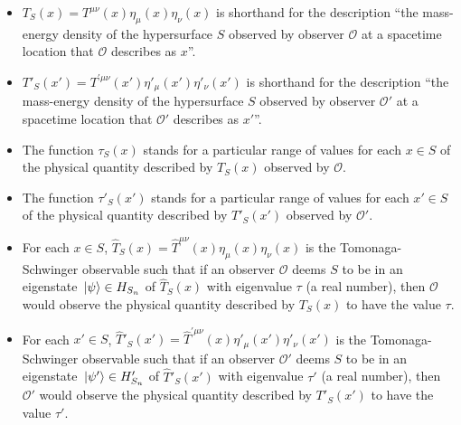 \begin{itemize}
%
\item $T_S(x)={T}^{\mu\nu}(x)\eta_{\mu}(x)\eta_{\nu}(x)$ is shorthand for the description ``the mass-energy density of the hypersurface $S$ observed by observer $\mathcal{O}$ at a spacetime location that $\mathcal{O}$ describes as $x$''. 
\item $T'_S(x')={T}^{\prime\mu\nu}(x')\eta'_{\mu}(x')\eta'_{\nu}(x')$ is shorthand for the description ``the mass-energy density of the hypersurface $S$ observed by observer $\mathcal{O}'$ at a spacetime location that $\mathcal{O}'$ describes as $x'$''. %
% 
\item The function $\tau_S(x)$ stands for a particular range of values for each $x\in S$ of the physical quantity described by $T_S(x)$ observed by $\mathcal{O}$. 
\item The function $\tau'_S(x')$ stands for a particular range of values for each $x'\in S$ of the physical quantity described by $T'_S(x')$ observed by $\mathcal{O}'$.  %
%
\item For each $x\in S$, $\hat{T}_S(x)=\hat{T}^{\mu\nu}(x)\eta_{\mu}(x)\eta_{\nu}(x)$ is the Tomonaga-Schwinger observable  such that if an observer $\mathcal{O}$ deems $S$ to be in an eigenstate $\ket*{\psi}\in H_{S_n}$ of  $\hat{T}_S(x)$ with eigenvalue $\tau$ (a real number), then  $\mathcal{O}$ would observe the physical quantity described by  $T_S(x)$ to have the value $\tau$. 
\item For each $x'\in S$, $\hat{T}'_S(x')=\hat{T}^{\prime\mu\nu}(x)\eta'_{\mu}(x')\eta'_{\nu}(x')$ is the Tomonaga-Schwinger observable  such that if an observer $\mathcal{O}'$ deems $S$ to be in an eigenstate $\ket*{\psi'}\in H'_{S_n}$ of  $\hat{T}'_S(x')$ with eigenvalue $\tau'$ (a real number), then  $\mathcal{O}'$ would observe the physical quantity described by  $T'_S(x')$ to have the value $\tau'$.  %
%
\end{itemize}



